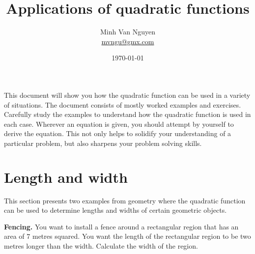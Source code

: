 \documentclass[a4paper,oneside,12pt]{article}
\begin{document}
\title{\Large\bf Applications of quadratic functions}
\author{%
  Minh Van Nguyen \\
  \url{mvngu@gmx.com}
}
\date{\today}
\maketitle

\noindent
This document will show you how the quadratic function can be used in
a variety of situations.  The document consists of mostly worked
examples and exercises.  Carefully study the examples to understand
how the quadratic function is used in each case.  Wherever an equation
is given, you should attempt by yourself to derive the equation.  This
not only helps to solidify your understanding of a particular problem,
but also sharpens your problem solving skills.



\section{Length and width}

This section presents two examples from geometry where the quadratic
function can be used to determine lengths and widths of certain
geometric objects.

\begin{example}
\textbf{Fencing.}
\label{ex:fence_a_rectangular_region}
You want to install a fence around a rectangular region that has an
area of $7$ metres squared.  You want the length of the rectangular
region to be two metres longer than the width.  Calculate the width of
the region.
\end{example}
\end{document}
